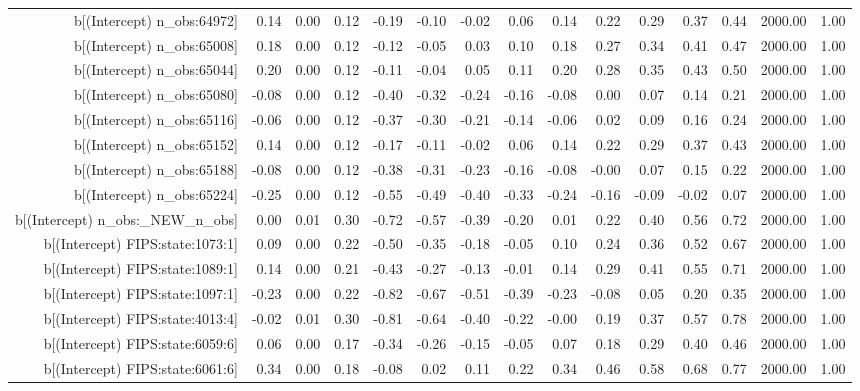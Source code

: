 \begin{table}[ht]
\begin{tabular}{rrrrrrrrrrrrrrr}
  b[(Intercept) n\_obs:64972] & 0.14 & 0.00 & 0.12 & -0.19 & -0.10 & -0.02 & 0.06 & 0.14 & 0.22 & 0.29 & 0.37 & 0.44 & 2000.00 & 1.00 \\ 
  b[(Intercept) n\_obs:65008] & 0.18 & 0.00 & 0.12 & -0.12 & -0.05 & 0.03 & 0.10 & 0.18 & 0.27 & 0.34 & 0.41 & 0.47 & 2000.00 & 1.00 \\ 
  b[(Intercept) n\_obs:65044] & 0.20 & 0.00 & 0.12 & -0.11 & -0.04 & 0.05 & 0.11 & 0.20 & 0.28 & 0.35 & 0.43 & 0.50 & 2000.00 & 1.00 \\ 
  b[(Intercept) n\_obs:65080] & -0.08 & 0.00 & 0.12 & -0.40 & -0.32 & -0.24 & -0.16 & -0.08 & 0.00 & 0.07 & 0.14 & 0.21 & 2000.00 & 1.00 \\ 
  b[(Intercept) n\_obs:65116] & -0.06 & 0.00 & 0.12 & -0.37 & -0.30 & -0.21 & -0.14 & -0.06 & 0.02 & 0.09 & 0.16 & 0.24 & 2000.00 & 1.00 \\ 
  b[(Intercept) n\_obs:65152] & 0.14 & 0.00 & 0.12 & -0.17 & -0.11 & -0.02 & 0.06 & 0.14 & 0.22 & 0.29 & 0.37 & 0.43 & 2000.00 & 1.00 \\ 
  b[(Intercept) n\_obs:65188] & -0.08 & 0.00 & 0.12 & -0.38 & -0.31 & -0.23 & -0.16 & -0.08 & -0.00 & 0.07 & 0.15 & 0.22 & 2000.00 & 1.00 \\ 
  b[(Intercept) n\_obs:65224] & -0.25 & 0.00 & 0.12 & -0.55 & -0.49 & -0.40 & -0.33 & -0.24 & -0.16 & -0.09 & -0.02 & 0.07 & 2000.00 & 1.00 \\ 
  b[(Intercept) n\_obs:\_NEW\_n\_obs] & 0.00 & 0.01 & 0.30 & -0.72 & -0.57 & -0.39 & -0.20 & 0.01 & 0.22 & 0.40 & 0.56 & 0.72 & 2000.00 & 1.00 \\ 
  b[(Intercept) FIPS:state:1073:1] & 0.09 & 0.00 & 0.22 & -0.50 & -0.35 & -0.18 & -0.05 & 0.10 & 0.24 & 0.36 & 0.52 & 0.67 & 2000.00 & 1.00 \\ 
  b[(Intercept) FIPS:state:1089:1] & 0.14 & 0.00 & 0.21 & -0.43 & -0.27 & -0.13 & -0.01 & 0.14 & 0.29 & 0.41 & 0.55 & 0.71 & 2000.00 & 1.00 \\ 
  b[(Intercept) FIPS:state:1097:1] & -0.23 & 0.00 & 0.22 & -0.82 & -0.67 & -0.51 & -0.39 & -0.23 & -0.08 & 0.05 & 0.20 & 0.35 & 2000.00 & 1.00 \\ 
  b[(Intercept) FIPS:state:4013:4] & -0.02 & 0.01 & 0.30 & -0.81 & -0.64 & -0.40 & -0.22 & -0.00 & 0.19 & 0.37 & 0.57 & 0.78 & 2000.00 & 1.00 \\ 
  b[(Intercept) FIPS:state:6059:6] & 0.06 & 0.00 & 0.17 & -0.34 & -0.26 & -0.15 & -0.05 & 0.07 & 0.18 & 0.29 & 0.40 & 0.46 & 2000.00 & 1.00 \\ 
  b[(Intercept) FIPS:state:6061:6] & 0.34 & 0.00 & 0.18 & -0.08 & 0.02 & 0.11 & 0.22 & 0.34 & 0.46 & 0.58 & 0.68 & 0.77 & 2000.00 & 1.00 \\ 

\end{tabular}
\end{table}
